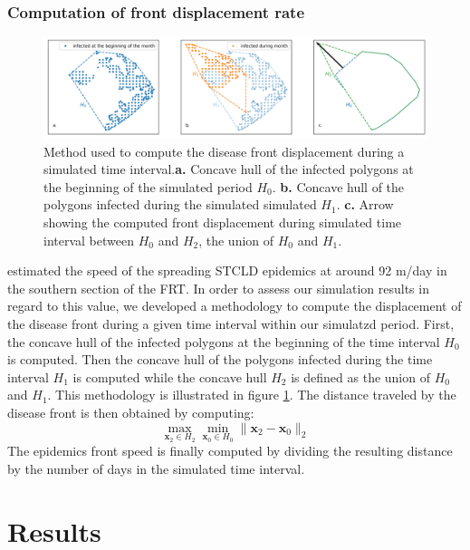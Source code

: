 \documentclass[utf8]{frontiersSCNS}
\begin{document}
\subsubsection{Computation of front displacement rate}
\begin{figure}
    \centering
    \includegraphics[width=.95\textwidth]{figures/hull_example.png}
    \caption{Method used to compute the disease front displacement during a simulated time interval.\textbf{a.} Concave hull of the infected polygons at the beginning of the simulated period $H_0$. \textbf{b.} Concave hull of the polygons infected during the simulated simulated $H_1$. \textbf{c.} Arrow showing the computed front displacement during simulated time interval between $H_0$ and $H_2$, the union of $H_0$ and $H_1$.}
    \label{fig:hull}
\end{figure}
\citep{muller2020spatial} estimated the speed of the spreading STCLD epidemics at around 92 m/day in the southern section of the FRT. In order to assess our simulation results in regard to this value, we developed a methodology to compute the displacement of the disease front during a given time interval within our simulatzd period. First, the concave hull of the infected polygons at the beginning of the time interval $H_0$ is computed. Then the concave hull of the polygons infected during the time interval $H_1$ is computed while the concave hull $H_2$ is defined as the union of $H_0$ and $H_1$. This methodology is illustrated in figure \ref{fig:hull}. The distance traveled by the disease front is then obtained by computing:
\begin{equation}
    \max\limits_{\mathbf{x}_2\in H_2}\min\limits_{\mathbf{x}_0\in H_0} \|\mathbf{x}_2 - \mathbf{x}_0\|_2
\end{equation}
The epidemics front speed is finally computed by dividing the resulting distance by the number of days in the simulated time interval.

\section{Results}
\end{document}
